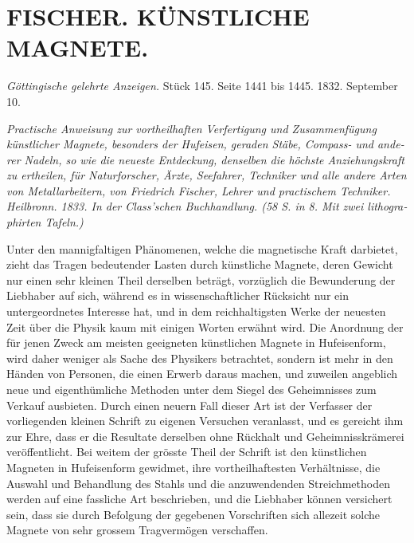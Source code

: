 \documentclass[fontsize=10pt,paper=a5,pagesize=auto]{scrbook}
\newcommand{\origpage}[1]{\marginpar{\footnotesize\textit{S. #1}}}
\begin{document}
\section*{FISCHER. KÜNSTLICHE MAGNETE.}
\label{sec:fischer}

\origpage{592}
\begin{otherlanguage}{ngerman}
\textit{Göttingische gelehrte Anzeigen.} Stück 145. Seite 1441 bis 1445. 1832. September 10.

\medskip

\textit{Practische Anweisung zur vortheilhaften Verfertigung und Zusammenfügung künstlicher Magnete, besonders der Hufeisen, geraden Stäbe, Compass- und anderer Nadeln, so wie die neueste Entdeckung, denselben die höchste Anziehungskraft zu ertheilen, für Naturforscher, Ärzte, Seefahrer, Techniker und alle andere Arten von Metallarbeitern, von Friedrich Fischer, Lehrer und practischem Techniker. Heilbronn. 1833. In der Class'schen Buchhandlung. (58 S. in 8. Mit zwei lithographirten Tafeln.)}
\end{otherlanguage}

Unter den mannigfaltigen Phänomenen, welche die magnetische Kraft darbietet, zieht das Tragen bedeutender Lasten durch künstliche Magnete, deren Gewicht nur einen sehr kleinen Theil derselben beträgt, vorzüglich die Bewunderung der Liebhaber auf sich, während es in wissenschaftlicher Rücksicht nur ein untergeordnetes Interesse hat, und in dem reichhaltigsten Werke der neuesten Zeit über die Physik kaum mit einigen Worten erwähnt wird. Die Anordnung der für jenen Zweck am meisten geeigneten künstlichen Magnete in Hufeisenform, wird daher weniger als Sache des Physikers betrachtet, sondern ist mehr in den Händen von Personen, die einen Erwerb daraus machen, und zuweilen angeblich neue und eigenthümliche Methoden unter dem Siegel des Geheimnisses zum Verkauf ausbieten. Durch einen neuern Fall dieser Art ist der Verfasser der vorliegenden kleinen Schrift zu eigenen Versuchen veranlasst, und es gereicht ihm zur Ehre, dass er die Resultate derselben ohne Rückhalt und Geheimnisskrämerei veröffentlicht. Bei weitem der grösste Theil der Schrift ist den künstlichen Magneten in Hufeisenform gewidmet, ihre vortheilhaftesten Verhältnisse, die Auswahl und Behandlung des Stahls und die anzuwendenden Streichmethoden werden auf eine fassliche Art beschrieben, und die Liebhaber können versichert sein, dass sie durch Befolgung der gegebenen Vorschriften sich allezeit solche Magnete von sehr grossem Tragvermögen verschaffen.
\end{document}
